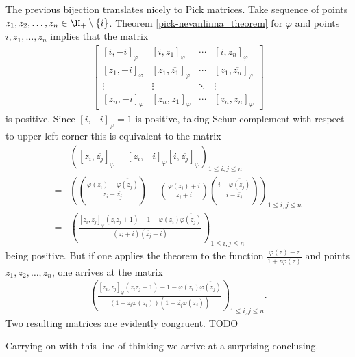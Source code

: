 The previous bijection translates nicely to Pick matrices. Take sequence of points $z_{1}, z_{2}, \ldots, z_{n} \in \H_{+} \setminus \{i\}$. Theorem \ref{pick-nevanlinna_theorem} for $\varphi$ and points $i, z_{1}, \ldots, z_{n}$ implies that the matrix
\begin{align*}
	\begin{bmatrix}
		[i, -i]_{\varphi} & [i, \overline{z_{1}}]_{\varphi} & \cdots & [i, \overline{z_{n}}]_{\varphi} \\
		[z_{1}, -i]_{\varphi} & [z_{1}, \overline{z_{1}}]_{\varphi} & \cdots & [z_{1}, \overline{z_{n}}]_{\varphi} \\
		\vdots & \vdots & \ddots & \vdots \\
		[z_{n}, -i]_{\varphi} & [z_{n}, \overline{z_{1}}]_{\varphi} & \cdots &  [z_{n}, \overline{z_{n}}]_{\varphi}
	\end{bmatrix}
\end{align*}
is positive. Since $[i, -i]_{\varphi} = 1$ is positive, taking Schur-complement with respect to upper-left corner this is equivalent to the matrix
\begin{align*}
	& \left([z_{i}, \overline{z_{j}}]_{\varphi} - [z_{i}, -i]_{\varphi}[i, \overline{z_{j}}]_{\varphi}\right)_{1 \leq i, j \leq n} \\
	=& \left(\left(\frac{\varphi(z_{i})- \overline{\varphi(z_{j})}}{z_{i} - \overline{z_{j}}}\right) - \left(\frac{\varphi(z_{i}) + i}{z_{i} + i}\right)\left(\frac{i - \overline{\varphi(z_{j})}}{i - \overline{z_{j}}}\right)\right)_{1 \leq i, j \leq n} \\
	=& \left(\frac{[z_{i}, \overline{z_{j}}]_{\varphi} (z_{i} \overline{z_{j}} + 1) - 1 - \varphi(z_{i}) \overline{\varphi(z_{j})}}{(z_{i} + i) (\overline{z_{j}} - i)}\right)_{1 \leq i, j \leq n}
\end{align*}
being positive. But if one applies the theorem to the function $\frac{\varphi(z) - z}{1 + z \varphi(z)}$ and points $z_{1}, z_{2}, \ldots, z_{n}$, one arrives at the matrix
\begin{align*}
	\left(\frac{[z_{i}, \overline{z_{j}}]_{\varphi} (z_{i} \overline{z_{j}} + 1) - 1 - \varphi(z_{i}) \overline{\varphi(z_{j})}}{(1 + z_{i} \varphi(z_{i}))(1 + \overline{z_{j}} \overline{\varphi(z_{j})})}\right)_{1 \leq i, j \leq n}.
\end{align*}
Two resulting matrices are evidently congruent. TODO

Carrying on with this line of thinking we arrive at a surprising conclusing.

